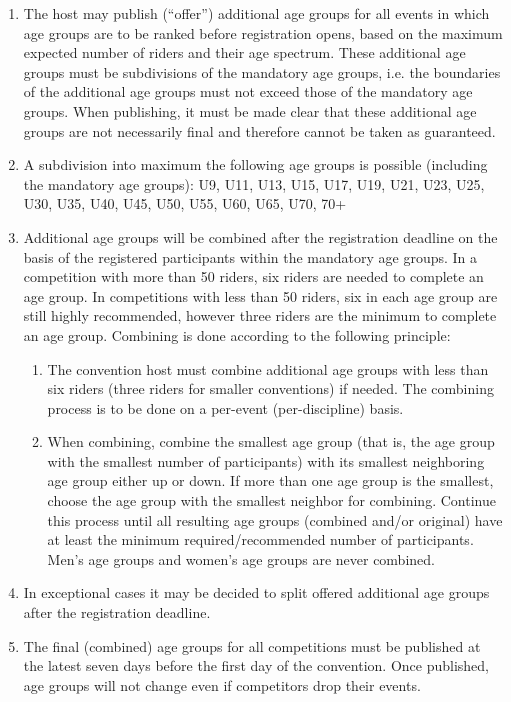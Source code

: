 \begin{enumerate}[leftmargin=1.5em,labelsep=*]
	\item The host may publish (“offer”) additional age groups for all events in which age groups are to be ranked before registration opens, based on the maximum expected number of riders and their age spectrum.
	These additional age groups must be subdivisions of the mandatory age groups, i.e. the boundaries of the additional age groups must not exceed those of the mandatory age groups.
	When publishing, it must be made clear that these additional age groups are not necessarily final and therefore cannot be taken as guaranteed.
	\item A subdivision into maximum the following age groups is possible (including the mandatory age groups):
	U9, U11, U13, U15, U17, U19, U21, U23, U25, U30, U35, U40, U45, U50, U55, U60, U65, U70, 70+
	\item Additional age groups will be combined after the registration deadline on the basis of the registered participants within the mandatory age groups.
	In a competition with more than 50 riders, six riders are needed to complete an age group.
	In competitions with less than 50 riders, six in each age group are still highly recommended, however three riders are the minimum to complete an age group.
	Combining is done according to the following principle:
	\begin{enumerate}[label=\roman*,leftmargin=1.75em,labelsep=*]
		\item  The convention host must combine additional age groups with less than six riders (three riders for smaller conventions) if needed.
		The combining process is to be done on a per-event (per-discipline) basis.
		\item  When combining, combine the smallest age group (that is, the age group with the smallest number of participants) with its smallest neighboring age group either up or down.
		If more than one age group is the smallest, choose the age group with the smallest neighbor for combining.
		Continue this process until all resulting age groups (combined and/or original) have at least the minimum required/recommended number of participants.
		Men's age groups and women's age groups are never combined.
	\end{enumerate}
	\item In exceptional cases it may be decided to split offered additional age groups after the registration deadline.
	\item The final (combined) age groups for all competitions must be published at the latest seven days before the first day of the convention.
	Once published, age groups will not change even if competitors drop their events.
\end{enumerate}

